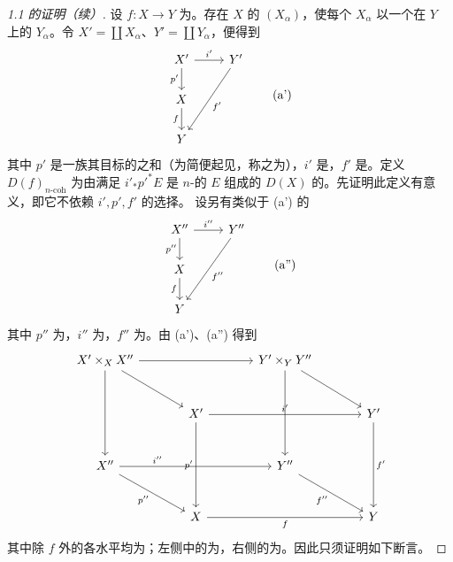 \begin{proof}[ 1.1 的证明（续）]
设 $f:X\to Y$ 为。存在 $X$ 的 $(X_\alpha)$，使每个 $X_\alpha$ 以一个在 $Y$ 上的 $Y_\alpha$。令 $X'=\coprod X_\alpha$、$Y'=\coprod Y_\alpha$，便得到
\[
\begin{tikzcd}X'\arrow[r,"i'"]\arrow[d,"p'"']&Y'\arrow[ddl,"f'"]\\X\arrow[d,"f"']&\\Y&\end{tikzcd}\tag{a'}
\]
其中 $p'$ 是一族其目标的之和（为简便起见，称之为），$i'$ 是，$f'$ 是。定义 $D(f)_{n\text{-coh}}$ 为由满足 $i'_*p'^*E$ 是 $n$-的 $E$ 组成的 $D(X)$ 的。先证明此定义有意义，即它不依赖 $i',p',f'$ 的选择。
设另有类似于 (a') 的
\[
\begin{tikzcd}X''\arrow[r,"i''"]\arrow[d,"p''"']&Y''\arrow[ddl,"f''"]\\X\arrow[d,"f"']&\\Y&\end{tikzcd}\tag{a''}
\]
其中 $p''$ 为，$i''$ 为，$f''$ 为。由 (a')、(a'') 得到
\[
\begin{tikzcd}[column sep=large,row sep=large]
X'\times_XX''\arrow[rr]\arrow[dr]\arrow[dd]& &Y'\times_YY''\arrow[dr]\arrow[dd]&\\
&X'\arrow[rr,"i'"]\arrow[dd,"p'"']&&Y'\arrow[dd,"f'"]\\
X''\arrow[rr,"i''" near start]\arrow[dr,"p''"']&&Y''\arrow[dr,"f''"']&\\
&X\arrow[rr,"f"']&&Y
\end{tikzcd}
\]
其中除 $f$ 外的各水平均为；左侧中的为，右侧的为。因此只须证明如下断言。


\end{proof}
